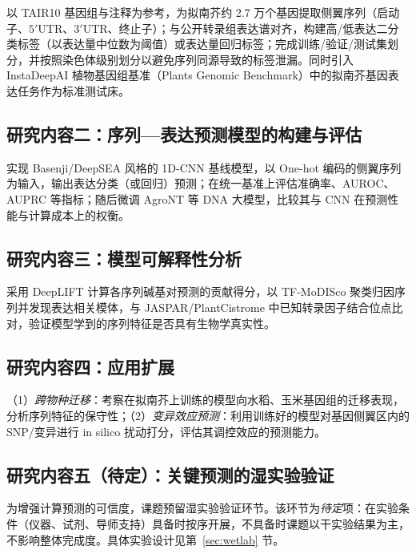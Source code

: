 \documentclass[UTF8,11pt,a4paper]{ctexart}
\begin{document}
以 TAIR10 基因组与注释为参考，为拟南芥约 2.7 万个基因提取侧翼序列（启动子、$5'$UTR、$3'$UTR、终止子）；与公开转录组表达谱对齐，构建高/低表达二分类标签（以表达量中位数为阈值）或表达量回归标签；完成训练/验证/测试集划分，并按照染色体级别划分以避免序列同源导致的标签泄漏。同时引入 InstaDeepAI 植物基因组基准（Plants Genomic Benchmark）中的拟南芥基因表达任务作为标准测试床\cite{pgb2024}。

\subsection{研究内容二：序列—表达预测模型的构建与评估}
\label{sec:objective-model}

实现 Basenji/DeepSEA 风格的 1D-CNN 基线模型，以 One-hot 编码的侧翼序列为输入，输出表达分类（或回归）预测；在统一基准上评估准确率、AUROC、AUPRC 等指标；随后微调 AgroNT\cite{mendoza2024} 等 DNA 大模型，比较其与 CNN 在预测性能与计算成本上的权衡。

\subsection{研究内容三：模型可解释性分析}
\label{sec:objective-interp}

采用 DeepLIFT 计算各序列碱基对预测的贡献得分，以 TF-MoDISco 聚类归因序列并发现表达相关模体，与 JASPAR/PlantCistrome 中已知转录因子结合位点比对，验证模型学到的序列特征是否具有生物学真实性。

\subsection{研究内容四：应用扩展}
\label{sec:objective-ext}

（1）\emph{跨物种迁移}：考察在拟南芥上训练的模型向水稻、玉米基因组的迁移表现，分析序列特征的保守性；（2）\emph{变异效应预测}：利用训练好的模型对基因侧翼区内的 SNP/变异进行 in silico 扰动打分，评估其调控效应的预测能力。

\subsection{研究内容五（待定）：关键预测的湿实验验证}
\label{sec:objective-wetlab}

为增强计算预测的可信度，课题预留湿实验验证环节。该环节为\emph{待定}项：在实验条件（仪器、试剂、导师支持）具备时按序开展，不具备时课题以干实验结果为主，不影响整体完成度。具体实验设计见第~\ref{sec:wetlab} 节。

\end{document}
